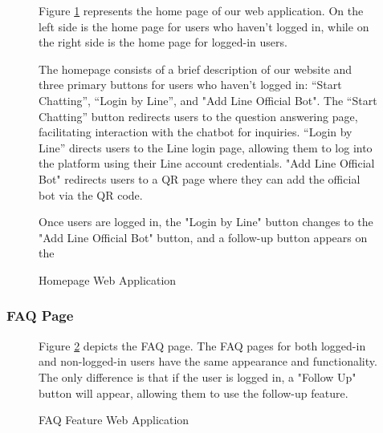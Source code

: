 \documentclass[12pt,oneside,openright,a4paper]{cpe-english-project}
\begin{document}
\begin{figure}[H]
            \caption{Homepage Web Application}\label{fig:WebAppHomepage}
            \begin{justify}
              \qquad Figure \ref{fig:WebAppHomepage} represents the home page of our web application. On the left side is the home page for users who haven't logged in, while on the right side is the home page for logged-in users.\par
              \qquad The homepage consists of a brief description of our website and three primary buttons for users who haven't logged in: “Start Chatting”, “Login by Line”, and "Add Line Official Bot". The “Start Chatting” button redirects users to the question answering page, facilitating interaction with the chatbot for inquiries. “Login by Line” directs users to the Line login page, allowing them to log into the platform using their Line account credentials. "Add Line Official Bot" redirects users to a QR page where they can add the official bot via the QR code.\par
              \qquad Once users are logged in, the "Login by Line" button changes to the "Add Line Official Bot" button, and a follow-up button appears on the\par
            \end{justify}
          \end{figure}
        \subsubsection{FAQ Page}
          \begin{figure}[H]
            \centering
            \caption{FAQ Feature Web Application}\label{fig:WebAppFAQ}
            \begin{justify}
              \qquad Figure \ref{fig:WebAppFAQ} depicts the FAQ page. The FAQ pages for both logged-in and non-logged-in users have the same appearance and functionality. The only difference is that if the user is logged in, a "Follow Up" button will appear, allowing them to use the follow-up feature.\par
            \end{justify}        
          \end{figure}
\end{document}
